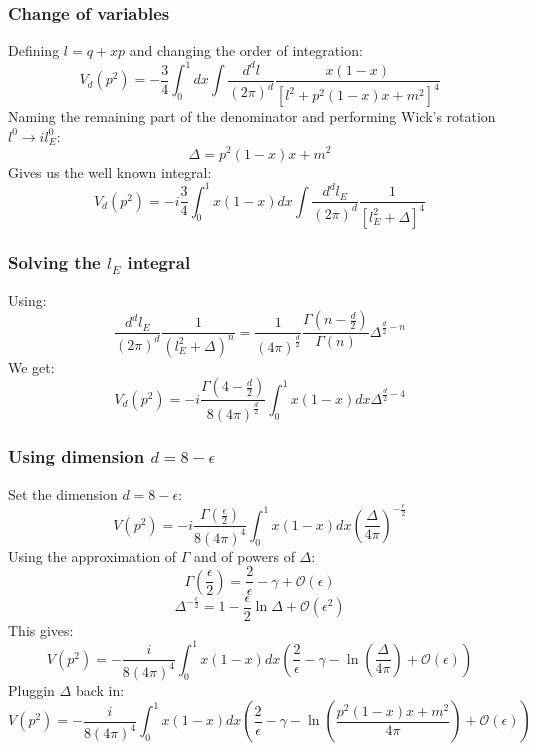 \documentclass{article}
\begin{document}
\subsubsection*{Change of variables}
Defining $l = q +xp$ and changing the order of integration:
\begin{equation}
    V_d(p^2) = -\frac{3}{4}\int_0^1 dx \int \frac{d^dl}{(2\pi)^d} \frac{x(1 - x)}{\left[l^2 + p^2(1 - x)x + m^2\right]^4}
\end{equation}
Naming the remaining part of the denominator and performing Wick's rotation $l^0 \rightarrow il_E^0$:
\begin{equation}
    \Delta = p^2(1 - x)x + m^2
\end{equation}
Gives us the well known integral:
\begin{equation}
    V_d(p^2) = -i\frac{3}{4}\int_0^1 x(1 - x)dx \int \frac{d^dl_E}{(2\pi)^d} \frac{1}{\left[l_E^2 + \Delta\right]^4}
\end{equation}
\subsubsection*{Solving the $l_E$ integral}
Using:
\begin{equation}
    \frac{d^dl_E}{(2\pi)^d} \frac{1}{(l_E^2 + \Delta)^n} = \frac{1}{(4\pi)^\frac{d}{2}}\frac{\Gamma\left(n - \frac{d}{2}\right)}{\Gamma(n)}\Delta^{\frac{d}{2} - n}
\end{equation}
We get:
\begin{equation}
    V_d(p^2) = -i\frac{\Gamma\left(4 - \frac{d}{2}\right)}{8(4\pi)^\frac{d}{2}}\int_0^1 x(1 - x)dx\Delta^{\frac{d}{2} - 4}
\end{equation}
\subsubsection*{Using dimension $d = 8 - \epsilon$}
Set the dimension $d = 8 - \epsilon$:
\begin{equation}
    V(p^2) = -i\frac{\Gamma\left(\frac{\epsilon}{2}\right)}{8(4\pi)^4}\int_0^1 x(1 - x)dx\left(\frac{\Delta}{4\pi}\right)^{-\frac{\epsilon}{2}}
\end{equation}
Using the approximation of $\Gamma$ and of powers of $\Delta$:
\begin{equation}
    \Gamma\left(\frac{\epsilon}{2}\right) = \frac{2}{\epsilon} - \gamma + \mathcal{O}(\epsilon)
\end{equation}
\begin{equation}
    \Delta^{-\frac{\epsilon}{2}} = 1 - \frac{\epsilon}{2} \ln\Delta + \mathcal{O}(\epsilon^2)
\end{equation}
This gives:
\begin{equation}
    V(p^2) = -\frac{i}{8(4\pi)^4}\int_0^1 x(1 - x)dx\left(\frac{2}{\epsilon} - \gamma - \ln\left(\frac{\Delta}{4\pi}\right) + \mathcal{O}(\epsilon)\right)
\end{equation}
Pluggin $\Delta$ back in:
\begin{equation}
    V(p^2) = -\frac{i}{8(4\pi)^4}\int_0^1 x(1 - x)dx\left(\frac{2}{\epsilon} - \gamma - \ln\left(\frac{p^2(1 - x)x + m^2}{4\pi}\right) + \mathcal{O}(\epsilon)\right)
\end{equation}
\end{document}
